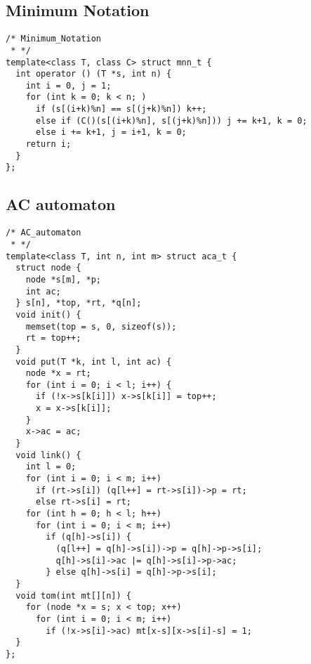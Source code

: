 \subsection{Minimum Notation}
\begin{lstlisting}
/* Minimum_Notation
 * */
template<class T, class C> struct mnn_t {
  int operator () (T *s, int n) {
    int i = 0, j = 1;
    for (int k = 0; k < n; )
      if (s[(i+k)%n] == s[(j+k)%n]) k++;
      else if (C()(s[(i+k)%n], s[(j+k)%n])) j += k+1, k = 0;
      else i += k+1, j = i+1, k = 0;
    return i;
  }
};
\end{lstlisting}


\subsection{AC automaton}
\begin{lstlisting}
/* AC_automaton
 * */
template<class T, int n, int m> struct aca_t {
  struct node {
    node *s[m], *p;
    int ac;
  } s[n], *top, *rt, *q[n];
  void init() {
    memset(top = s, 0, sizeof(s));
    rt = top++;
  }
  void put(T *k, int l, int ac) {
    node *x = rt;
    for (int i = 0; i < l; i++) {
      if (!x->s[k[i]]) x->s[k[i]] = top++;
      x = x->s[k[i]];
    }
    x->ac = ac;
  }
  void link() {
    int l = 0;
    for (int i = 0; i < m; i++)
      if (rt->s[i]) (q[l++] = rt->s[i])->p = rt;
      else rt->s[i] = rt;
    for (int h = 0; h < l; h++)
      for (int i = 0; i < m; i++)
        if (q[h]->s[i]) {
          (q[l++] = q[h]->s[i])->p = q[h]->p->s[i];
          q[h]->s[i]->ac |= q[h]->s[i]->p->ac;
        } else q[h]->s[i] = q[h]->p->s[i];
  }
  void tom(int mt[][n]) {
    for (node *x = s; x < top; x++)
      for (int i = 0; i < m; i++)
        if (!x->s[i]->ac) mt[x-s][x->s[i]-s] = 1;
  }
};
\end{lstlisting}


